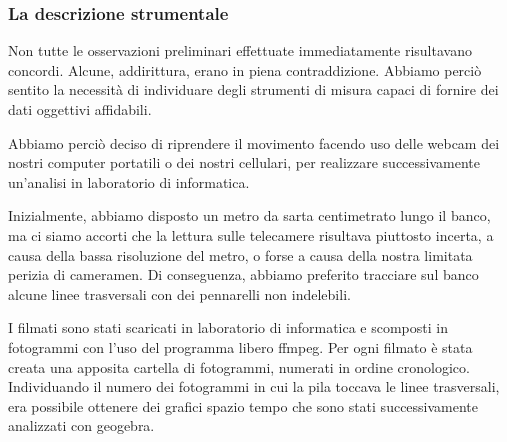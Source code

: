 \subsubsection*{La descrizione strumentale}

Non tutte le osservazioni preliminari effettuate immediatamente risultavano concordi. Alcune, addirittura, erano in piena contraddizione. Abbiamo perciò sentito la necessità di individuare degli strumenti di misura capaci di fornire dei dati oggettivi affidabili.\newline

Abbiamo perciò deciso di riprendere il movimento facendo uso delle webcam dei nostri computer portatili o dei nostri cellulari, per realizzare successivamente un'analisi in laboratorio di informatica.\newline

Inizialmente, abbiamo disposto un metro da sarta centimetrato lungo il banco, ma ci siamo accorti che la lettura sulle telecamere risultava piuttosto incerta, a causa della bassa risoluzione del metro, o forse a causa della nostra limitata perizia di cameramen. Di conseguenza, abbiamo preferito tracciare sul banco alcune linee trasversali con dei pennarelli non indelebili.

I filmati sono stati scaricati in laboratorio di informatica e scomposti in fotogrammi con l'uso del programma libero ffmpeg.\newline
Per ogni filmato è stata creata una apposita cartella di fotogrammi, numerati in ordine cronologico. Individuando il numero dei fotogrammi in cui la pila toccava le linee trasversali, era possibile ottenere dei grafici spazio tempo che sono stati successivamente analizzati con geogebra.
